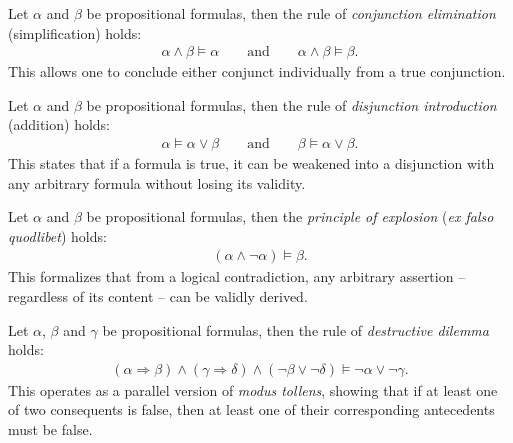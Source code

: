 \begin{examples}
\begin{exampleenumerate}
        \item Let $\alpha$ and $\beta$ be propositional formulas, then the rule of \emph{conjunction elimination} (simplification) holds:
        \begin{align}\alpha\land\beta\vDash\alpha \qquad\text{and}\qquad \alpha\land\beta\vDash\beta.\end{align}
        This allows one to conclude either conjunct individually from a true conjunction.

        \item Let $\alpha$ and $\beta$ be propositional formulas, then the rule of \emph{disjunction introduction} (addition) holds:
        \begin{align}\alpha\vDash\alpha\lor\beta \qquad\text{and}\qquad \beta\vDash\alpha\lor\beta.\end{align}
        This states that if a formula is true, it can be weakened into a disjunction with any arbitrary formula without losing its validity.

        \item Let $\alpha$ and $\beta$ be propositional formulas, then the \emph{principle of explosion} (\emph{ex falso quodlibet}) holds:
        \begin{align}(\alpha\land\lnot\alpha)\vDash\beta.\end{align}
        This formalizes that from a logical contradiction, any arbitrary assertion -- regardless of its content -- can be validly derived.

        \item Let $\alpha$, $\beta$ and $\gamma$ be propositional formulas, then the rule of \emph{destructive dilemma} holds:
        \begin{align}(\alpha\Rightarrow\beta) \land (\gamma\Rightarrow\delta) \land (\lnot\beta \lor \lnot\delta)\vDash\lnot\alpha \lor \lnot\gamma.\end{align}
        This operates as a parallel version of \emph{modus tollens}, showing that if at least one of two consequents is false, then at least one of their corresponding antecedents must be false.
    \end{exampleenumerate}
\end{examples}